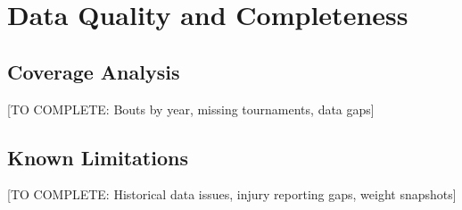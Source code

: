 \section{Data Quality and Completeness}

\subsection{Coverage Analysis}

[TO COMPLETE: Bouts by year, missing tournaments, data gaps]

\subsection{Known Limitations}

[TO COMPLETE: Historical data issues, injury reporting gaps, weight snapshots]